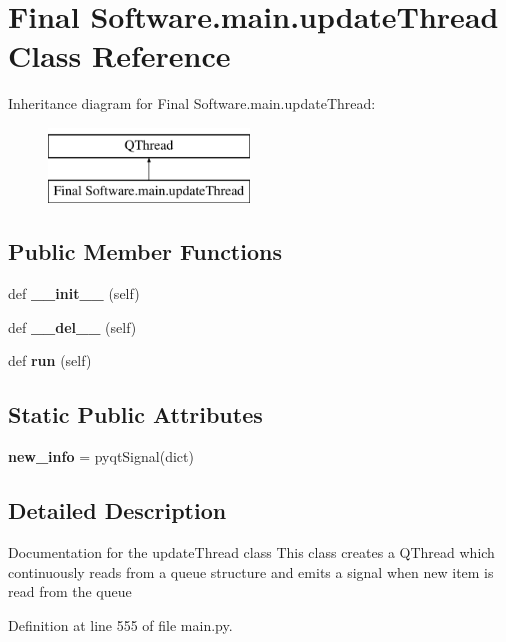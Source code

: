 \section{Final Software.\+main.\+update\+Thread Class Reference}
\label{class_final_01_software_1_1main_1_1update_thread}
Inheritance diagram for Final Software.\+main.\+update\+Thread\+:\begin{figure}[H]
\begin{center}
\leavevmode
\includegraphics[height=2.000000cm]{class_final_01_software_1_1main_1_1update_thread}
\end{center}
\end{figure}
\subsection*{Public Member Functions}
\begin{DoxyCompactItemize}
\item 
def \textbf{ \+\_\+\+\_\+init\+\_\+\+\_\+} (self)
\item 
def \textbf{ \+\_\+\+\_\+del\+\_\+\+\_\+} (self)
\item 
def \textbf{ run} (self)
\end{DoxyCompactItemize}
\subsection*{Static Public Attributes}
\begin{DoxyCompactItemize}
\item 
\textbf{ new\+\_\+info} = pyqt\+Signal(dict)
\end{DoxyCompactItemize}


\subsection{Detailed Description}
\begin{DoxyVerb}Documentation for the updateThread class
This class creates a QThread which continuously reads from a queue structure
and emits a signal when new item is read from the queue\end{DoxyVerb}
 

Definition at line 555 of file main.\+py.



